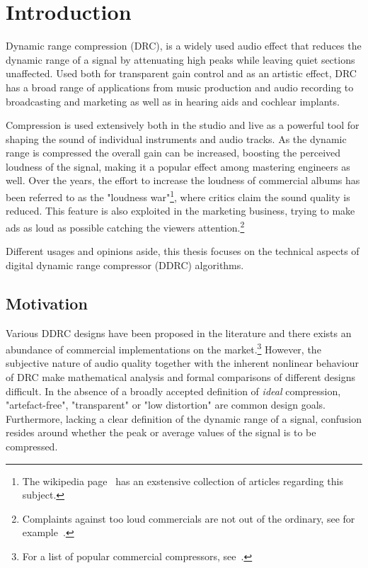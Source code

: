 \documentclass[../main2.tex]{subfiles}
\begin{document}
\section{Introduction}
Dynamic range compression (DRC), is a widely used audio effect that reduces the dynamic range of a signal by attenuating high peaks while leaving quiet sections unaffected. Used both for transparent gain control and as an artistic effect, DRC has a broad range of applications from music production and audio recording to broadcasting and marketing as well as in hearing aids and cochlear implants.

Compression is used extensively both in the studio and live as a powerful tool for shaping the sound of individual instruments and audio tracks. As the dynamic range is compressed the overall gain can be increased, boosting the perceived loudness of the signal, making it a popular effect among mastering engineers as well. Over the years, the effort to increase the loudness of commercial albums has been referred to as the "loudness war"\footnote{The wikipedia page~\cite{loudness_war} has an exstensive collection of articles regarding this subject.}, where critics claim the sound quality is reduced. This feature is also exploited in the marketing business, trying to make ads as loud as possible catching the viewers attention.\footnote{Complaints against too loud commercials are not out of the ordinary, see for example~\cite{comp_ads}.} 

Different usages and opinions aside, this thesis focuses on the technical aspects of digital dynamic range compressor (DDRC) algorithms. 


\subsection{Motivation}
Various DDRC designs have been proposed in the literature and there exists an abundance of commercial implementations on the market.\footnote{For a list of popular commercial compressors, see~\cite{commercial}.} However, the subjective nature of audio quality together with the inherent nonlinear behaviour of DRC make mathematical analysis and formal comparisons of different designs difficult. In the absence of a broadly accepted definition of \emph{ideal} compression, "artefact-free", "transparent" or "low distortion" are common design goals. Furthermore, lacking a clear definition of the dynamic range of a signal, confusion resides around whether the peak or average values of the signal is to be compressed. 
\end{document}

